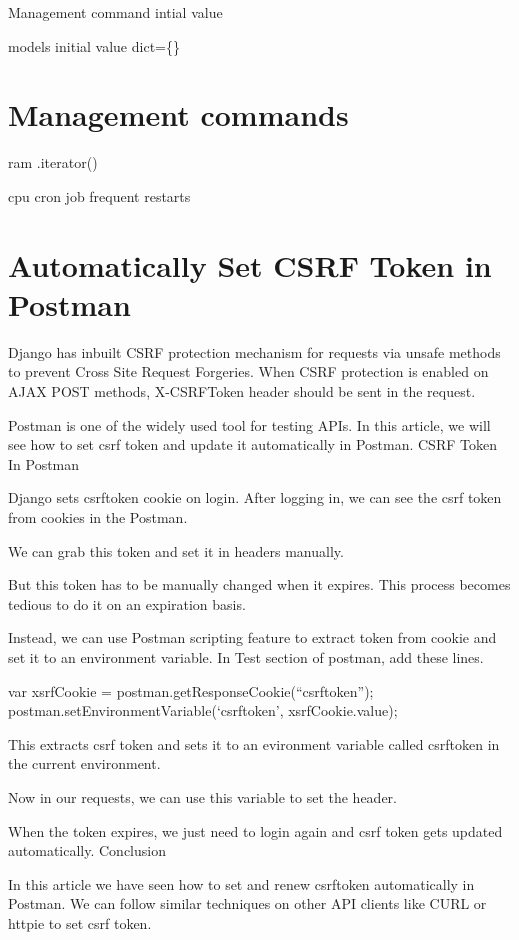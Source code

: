 \documentclass[letterpaper,11pt,english]{sphinxmanual}
\begin{document}
Management command
intial value

models initial value
dict=\{\}


\chapter{Management commands}
\label{\detokenize{misc_management_commands:management-commands}}\label{\detokenize{misc_management_commands::doc}}
ram
.iterator()

cpu
cron job
frequent restarts


\chapter{Automatically Set CSRF Token in Postman}
\label{\detokenize{misc_postman_csrf_token:automatically-set-csrf-token-in-postman}}\label{\detokenize{misc_postman_csrf_token::doc}}
Django has inbuilt CSRF protection mechanism for requests via unsafe methods to prevent Cross Site Request Forgeries. When CSRF protection is enabled on AJAX POST methods, X-CSRFToken header should be sent in the request.

Postman is one of the widely used tool for testing APIs. In this article, we will see how to set csrf token and update it automatically in Postman.
CSRF Token In Postman

Django sets csrftoken cookie on login. After logging in, we can see the csrf token from cookies in the Postman.

We can grab this token and set it in headers manually.

But this token has to be manually changed when it expires. This process becomes tedious to do it on an expiration basis.

Instead, we can use Postman scripting feature to extract token from cookie and set it to an environment variable. In Test section of postman, add these lines.

var xsrfCookie = postman.getResponseCookie(“csrftoken”);
postman.setEnvironmentVariable(‘csrftoken’, xsrfCookie.value);

This extracts csrf token and sets it to an evironment variable called csrftoken in the current environment.

Now in our requests, we can use this variable to set the header.

When the token expires, we just need to login again and csrf token gets updated automatically.
Conclusion

In this article we have seen how to set and renew csrftoken automatically in Postman. We can follow similar techniques on other API clients like CURL or httpie to set csrf token.
\end{document}
